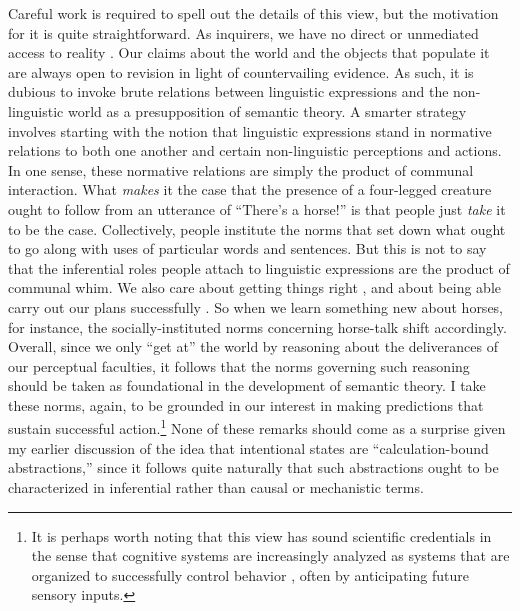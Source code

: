 Careful work is required to spell out the details of this view, but the motivation for it is quite straightforward. As inquirers, we have no direct or unmediated access to reality \citep{Misak:2013,Peirce:1992}. Our claims about the world and the objects that populate it are always open to revision in light of countervailing evidence. As such, it is dubious to invoke brute relations between linguistic expressions and the non-linguistic world as a presupposition of semantic theory. A smarter strategy involves starting with the notion that linguistic expressions stand in normative relations to both one another and certain non-linguistic perceptions and actions. In one sense, these normative relations are simply the product of communal interaction. What \textit{makes} it the case that the presence of a four-legged creature ought to follow from an utterance of  ``There's a horse!'' is that people just \textit{take} it to be the case. Collectively, people institute the norms that set down what ought to go along with uses of particular words and sentences. But this is not to say that the inferential roles people attach to linguistic expressions are the product of communal whim. We also care about getting things right \citep{Misak:2013}, and about being able carry out our plans successfully \citep{Whyte:1990}. So when we learn something new about horses, for instance, the socially-instituted norms concerning horse-talk shift accordingly. Overall, since we only ``get at'' the world by reasoning about the deliverances of our perceptual faculties, it follows that the norms governing such reasoning should be taken as foundational in the development of semantic theory. I take these norms, again, to be grounded in our interest in making predictions that sustain successful action.\footnote{It is perhaps worth noting that this view has sound scientific credentials in the sense that cognitive systems are increasingly analyzed as systems that are organized to successfully control behavior \citep[see e.g.,][]{Eliasmith:2003,Eliasmith:2013,clark:2013}, often by anticipating future sensory inputs.} None of these remarks should come as a surprise given my earlier discussion of the idea that intentional states are ``calculation-bound abstractions,'' since it follows quite naturally that such abstractions ought to be characterized in inferential rather than causal or mechanistic terms. 

